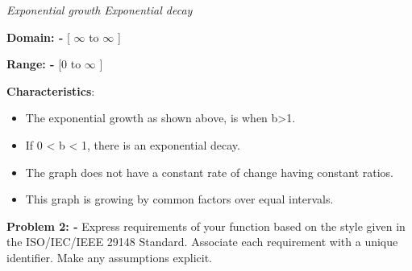 \documentclass[12pt]{article}
\begin{document}

\par


\begin{adjustwidth}{0.5in}{0.0in}
\textit{Exponential growth \tabto{3.99in} Exponential decay}\par

\end{adjustwidth}


\vspace{\baselineskip}
\vspace{\baselineskip}
\vspace{\baselineskip}



\textbf{Domain: - }{[ $\infty$ } to { $\infty$ ]} \par
\textbf{Range: - }[0 to { $\infty$ ]} \par

\vspace{\baselineskip}
\vspace{\baselineskip}

\textbf{Characteristics}: \par 

\begin{itemize}
    \item The exponential growth as shown above, is when b>1.\par
    \item If 0 < b < 1, there is an exponential decay.\par
	\item The graph does not have a constant rate of change having constant ratios.\par

	\item This graph is growing by common factors over equal intervals.
\end{itemize}\par


\vspace{\baselineskip}
\vspace{\baselineskip}
\vspace{\baselineskip}
\vspace{\baselineskip}
\vspace{\baselineskip}\textbf{Problem 2: - }Express requirements of your function based on the style given in the ISO/IEC/IEEE 29148 Standard. Associate each requirement with a unique identifier. Make any assumptions explicit.\par
\end{document}
